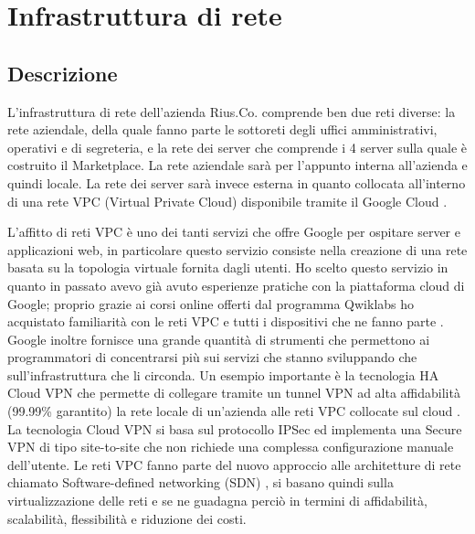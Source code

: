 \section{Infrastruttura di rete}
\subsection{Descrizione}
L'infrastruttura di rete dell'azienda Rius.Co. comprende ben due reti diverse: la rete aziendale, della quale fanno parte le sottoreti degli uffici amministrativi, operativi e di segreteria, e la rete dei server che comprende i 4 server sulla quale è costruito il Marketplace. La rete aziendale sarà per l'appunto interna all'azienda e quindi locale. La rete dei server sarà invece esterna in quanto collocata all'interno di una rete VPC (Virtual Private Cloud) disponibile tramite il Google Cloud \cite{VPC}. 
\medskip

L'affitto di reti VPC è uno dei tanti servizi che offre Google per ospitare server e applicazioni web, in particolare questo servizio consiste nella creazione di una rete basata su la topologia virtuale fornita dagli utenti. Ho scelto questo servizio in quanto in passato avevo già avuto esperienze pratiche con la piattaforma cloud di Google; proprio grazie ai corsi online offerti dal programma Qwiklabs ho acquistato familiarità con le reti VPC e tutti i dispositivi che ne fanno parte \cite{Qwiklabs}. Google inoltre fornisce una grande quantità di strumenti che permettono ai programmatori di concentrarsi più sui servizi che stanno sviluppando che sull'infrastruttura che li circonda. Un esempio importante è la tecnologia HA Cloud VPN che permette di collegare tramite un tunnel VPN ad alta affidabilità (99.99\% garantito) la rete locale di un'azienda alle reti VPC collocate sul cloud \cite{CloudVPN}. La tecnologia Cloud VPN si basa sul protocollo IPSec ed implementa una Secure VPN di tipo site-to-site che non richiede una complessa configurazione manuale dell'utente. Le reti VPC fanno parte del nuovo approccio alle architetture di rete chiamato Software-defined networking (SDN) \cite{SDN}, si basano quindi sulla virtualizzazione delle reti e se ne guadagna perciò in termini di affidabilità, scalabilità, flessibilità e riduzione dei costi.
\medskip

